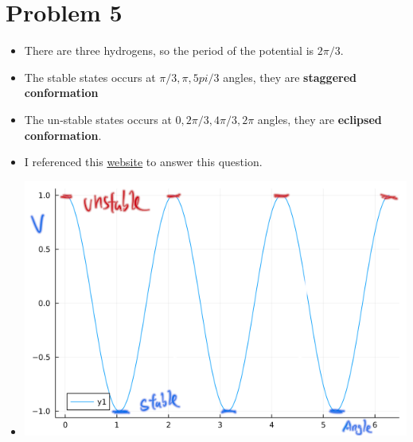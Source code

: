 \documentclass[11pt]{article}
\begin{document}
\section{Problem 5}
\label{sec:org7e3a3ac}
\begin{itemize}
\item There are three hydrogens, so the period of the potential is \(2\pi/3\).
\item The stable states occurs at \(\pi/3,\pi, 5pi/3\) angles, they are \textbf{staggered
conformation}
\item The un-stable states occurs at \(0, 2\pi/3, 4\pi/3, 2\pi\) angles, they are
\textbf{eclipsed conformation}.
\item I referenced this \href{https://www.masterorganicchemistry.com/2020/02/28/staggered-vs-eclipsed-conformations-of-ethane/}{website} to answer this question.
\item \begin{center}
\includegraphics[width=.9\linewidth]{./periodic_potential.png}
\end{center}
\end{itemize}
\end{document}
